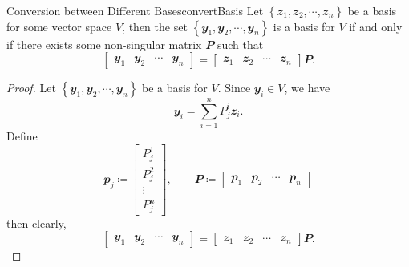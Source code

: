 \documentclass[math, code]{amznotes}
\theoremstyle{remark}
\begin{document}
\begin{probox}{Conversion between Different Bases}{convertBasis}
    Let $\left\{\mathbfit{z}_1, \mathbfit{z}_2, \cdots, \mathbfit{z}_n\right\}$ be a basis for some vector space $V$, then the set $\left\{\mathbfit{y}_1, \mathbfit{y}_2, \cdots, \mathbfit{y}_n\right\}$ is a basis for $V$ if and only if there exists some non-singular matrix $\mathbfit{P}$ such that 
    \begin{equation*}
        \begin{bmatrix}
            \mathbfit{y}_1 & \mathbfit{y}_2 & \cdots & \mathbfit{y}_n
        \end{bmatrix} = \begin{bmatrix}
            \mathbfit{z}_1 & \mathbfit{z}_2 & \cdots & \mathbfit{z}_n
        \end{bmatrix}\mathbfit{P}.
    \end{equation*}
    \tcblower
    \begin{proof}
        Let $\left\{\mathbfit{y}_1, \mathbfit{y}_2, \cdots, \mathbfit{y}_n\right\}$ be a basis for $V$. Since $\mathbfit{y}_i \in V$, we have 
        \begin{equation*}
            \mathbfit{y}_i = \sum_{i = 1}^{n}P^{i}_{j}\mathbfit{z}_i.
        \end{equation*}
        Define 
        \begin{equation*}
            \mathbfit{p}_j \coloneqq \begin{bmatrix}
                P^1_j \\
                P^2_j \\
                \vdots \\
                P^n_j
            \end{bmatrix}, \qquad \mathbfit{P} \coloneqq \begin{bmatrix}
                \mathbfit{p}_1 & \mathbfit{p}_2 & \cdots & \mathbfit{p}_n
            \end{bmatrix}
        \end{equation*}
        then clearly, 
        \begin{equation*}
            \begin{bmatrix}
                \mathbfit{y}_1 & \mathbfit{y}_2 & \cdots & \mathbfit{y}_n
            \end{bmatrix} = \begin{bmatrix}
                \mathbfit{z}_1 & \mathbfit{z}_2 & \cdots & \mathbfit{z}_n
            \end{bmatrix}\mathbfit{P}.

\end{equation*}
\end{proof}
\end{probox}
\end{document}
